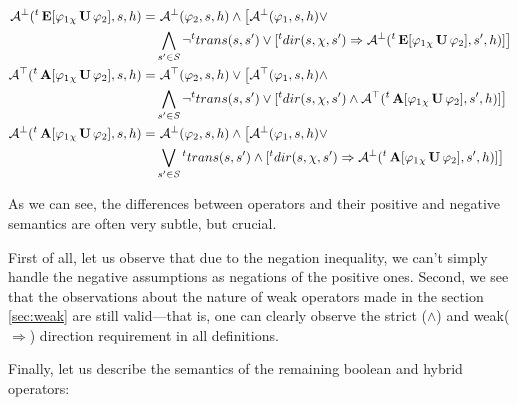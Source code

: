 \begin{align*}
	\mathcal{A}^\bot({}^{t}\operatorname{\mathbf{E}}[ \varphi_1 {}_{\chi}\operatorname{\mathbf{U}} \varphi_2], s, h) = &\ \mathcal{A}^\bot(\varphi_2, s, h) \land \big[ \mathcal{A}^\bot(\varphi_1, s, h) \lor \\
	& \bigwedge_{s' \in \mathit{S}} \neg{}^{t}trans(s,s') \lor [{}^{t}dir(s, \chi, s') \Rightarrow \mathcal{A}^\bot({}^{t}\operatorname{\mathbf{E}}[ \varphi_1 {}_{\chi}\operatorname{\mathbf{U}} \varphi_2], s', h)] \big] \\
	\mathcal{A}^\top({}^{t}\operatorname{\mathbf{A}}[ \varphi_1 {}_{\chi}\operatorname{\mathbf{U}} \varphi_2], s, h) = &\ \mathcal{A}^\top(\varphi_2, s, h) \lor \big[ \mathcal{A}^\top(\varphi_1, s, h) \land \\
	& \bigwedge_{s' \in \mathit{S}} \neg{}^{t}trans(s,s') \lor [{}^{t}dir(s, \chi, s') \land \mathcal{A}^\top({}^{t}\operatorname{\mathbf{A}}[ \varphi_1 {}_{\chi}\operatorname{\mathbf{U}} \varphi_2], s', h)] \big] \\
	\mathcal{A}^\bot({}^{t}\operatorname{\mathbf{A}}[ \varphi_1 {}_{\chi}\operatorname{\mathbf{U}} \varphi_2], s, h) = &\ \mathcal{A}^\bot(\varphi_2, s, h) \land \big[ \mathcal{A}^\bot(\varphi_1, s, h) \lor \\
	& \bigvee_{s' \in \mathit{S}} {}^{t}trans(s,s') \land [{}^{t}dir(s, \chi, s') \Rightarrow \mathcal{A}^\bot({}^{t}\operatorname{\mathbf{A}}[ \varphi_1 {}_{\chi}\operatorname{\mathbf{U}} \varphi_2], s', h)] \big] \\
\end{align*}

As we can see, the differences between operators and their positive and negative semantics are often very subtle, but crucial.

First of all, let us observe that due to the negation inequality, we can't simply handle the negative assumptions as negations of the positive ones. Second, we see that the observations about the nature of weak operators made in the section \ref{sec:weak} are still valid—that is, one can clearly observe the strict ($\land$) and weak($\Rightarrow$) direction requirement in all definitions.

Finally, let us describe the semantics of the remaining boolean and hybrid operators:

